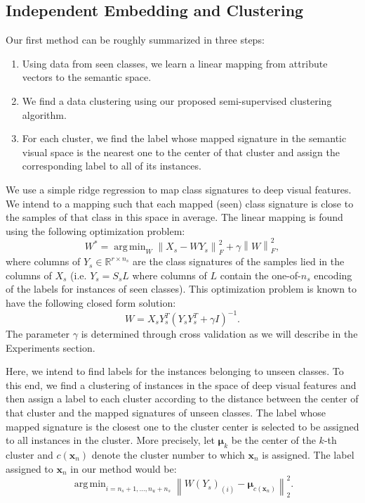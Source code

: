 \documentclass[10pt,twocolumn,letterpaper]{article}
\newcommand{\norm}[1]{\left \lVert #1 \right \rVert_{F}^2}
\newcommand{\normtwo}[1]{\left \lVert #1 \right \rVert_2^2}
\DeclareMathOperator*{\argmin}{arg\,min}
\begin{document}
\subsection{Independent Embedding and Clustering} \label{clustering}
Our first method can be roughly summarized in three steps:
\begin{enumerate}
  \item
   Using data from seen classes, we learn a linear mapping from attribute vectors to the semantic space.
  \item We find a data clustering using our proposed semi-supervised clustering algorithm.
  \item For each cluster, we find the label whose mapped signature in the semantic visual space is the nearest one to the center of that cluster
   and assign the corresponding label to all of its instances.
\end{enumerate}
We use a simple ridge regression to map class signatures to deep visual features.
 We intend to a mapping such that each mapped (seen) class signature is close to the samples of that class in this space in average.
The linear mapping is found using the following optimization problem:
\begin{equation} \label{eq:mapping}
  W^* = \argmin_W \norm{X_s - W Y_s} + \gamma \norm{W},
\end{equation}
where columns of $ Y_s \in \mathbb{R}^{r \times n_s} $ are the class signatures of the samples lied in the columns of $X_s$ (i.e. $Y_s=S_sL$ where columns of $L$ contain the one-of-$n_s$ encoding of the labels for instances of seen classes).
This optimization problem is known to have the following closed form solution:
\begin{equation} \label{eq:dic}
  W = X_s Y_s^T (Y_s Y_s^T + \gamma I)^{-1}.
\end{equation}
The parameter $\gamma$ is determined through cross validation as we will describe in the Experiments section.

Here, we intend to find labels for the instances belonging to unseen classes. To this end, we find a clustering of instances
 in the space of deep visual features and then assign a label to each cluster according to the distance between the center of that cluster
 and the mapped signatures of unseen classes.
The label whose mapped signature is the closest one to the cluster center is selected to be assigned to all instances in the cluster.
More precisely, let $\boldsymbol{\mu}_k$ be the center of the $k$-th cluster and $c(\mathbf{x}_n)$ denote the cluster number to which $\mathbf{x}_n$ is assigned.
The label assigned to $\mathbf{x}_n$ in our method would be:
\begin{equation} \label{eq:label_assign}
  \argmin_{i=n_s + 1,\ldots, n_u + n_s} \normtwo{ W(Y_s)_{(i)} - \boldsymbol{\mu}_{c(\mathbf{x}_n)} }.
\end{equation}
\end{document}
